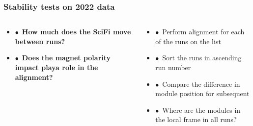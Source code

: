 \documentclass[xcolor=dvipsnames, aspectratio=1610, 12pt]{beamer}
\begin{document}
\begin{frame}\frametitle{Stability tests on 2022 data}
  \begin{columns}
    \begin{column}[c]{0.4\textwidth}
      \begin{itemize}
        \setlength\itemsep{1em}
        \item $\bullet$\, \textbf{How much does the SciFi move between runs?}
        \item $\bullet$\, \textbf{Does the magnet polarity impact playa role in the alignment?}
      \end{itemize}
    \end{column}
    \begin{column}[c]{0.6\textwidth}
      \begin{itemize}
        \item $\bullet$\, Perform alignment for each of the runs on the list
        \item $\bullet$\, Sort the runs in ascending run number
        \item $\bullet$\, Compare the difference in module position for subsequent
        \item $\bullet$\, Where are the modules in the local frame in all runs?
      \end{itemize}
    \end{column}
  \end{columns}
\end{frame}
\end{document}
